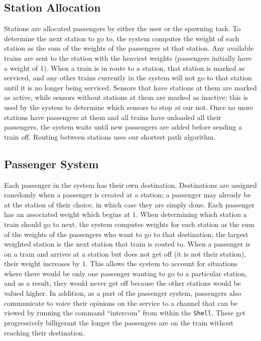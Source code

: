 \documentclass[12pt]{article}
\begin{document}
\subsection{Station Allocation}
Stations are allocated passengers by either the user or the spawning task.  To determine the next station to go to, the system computes the weight of each station as the sum of the weights of the passengers at that station.  Any available trains are sent to the station with the heaviest weights (passengers initially have a weight of 1).  When a train is in route to a station, that station is marked as serviced, and any other trains currently in the system will not go to that station until it is no longer being serviced.  Sensors that have stations at them are marked as active, while sensors without stations at them are marked as inactive; this is used by the system to determine which sensors to stop at our not.  Once no more stations have passengers at them and all trains have unloaded all their passengers, the system waits until new passengers are added before sending a train off.  Routing between stations uses our shortest path algorithm.
\\[1\baselineskip]
\subsection{Passenger System}
Each passenger in the system has their own destination.  Destinations are assigned ranedomly when a passenger is created at a station; a passenger may already be at the station of their choice, in which case they are simply done.  Each passenger has an associated weight which begins at $1$.  When determining which station a train should go to next, the system computes weights for each station as the sum of the weights of the passengers who want to go to that destination; the largest weighted station is the next station that train is routed to.  When a passenger is on a train and arrives at a station but does not get off (it is not their station), their weight increases by $1$.  This allows the system to account for situations where there would be only one passenger wanting to go to a particular station, and as a result, they would never get off because the other stations would be valued higher.  In addition, as a part of the passenger system, passengers also communicate to voice their opinions on the service to a channel that can be viewed by running the command ``intercom'' from within the \texttt{Shell}.  These get progressively billigerant the longer the passengers are on the train without reaching their destination.
\\[1\baselineskip]
\end{document}
